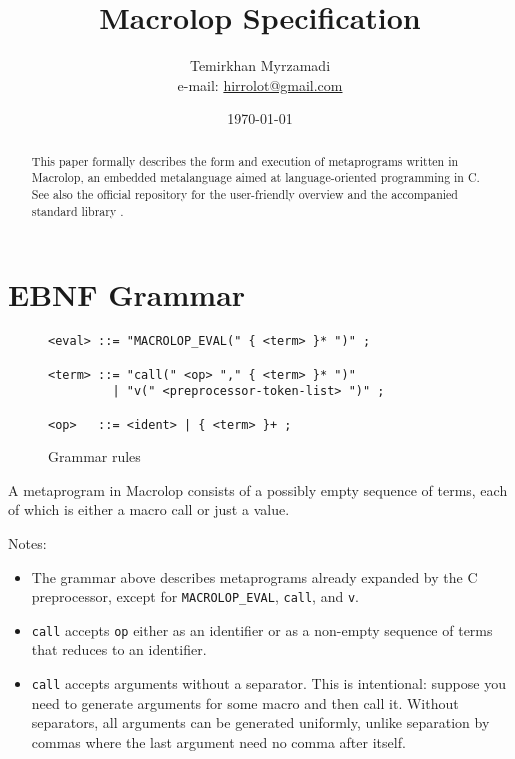 \documentclass[12pt]{article}
\theoremstyle{break}
\begin{document}
\title{Macrolop Specification}
\date{\today}
\author{Temirkhan Myrzamadi \\ e-mail: \href{mailto:hirrolot@gmail.com}{hirrolot@gmail.com}}
\maketitle

\begin{abstract}
This paper formally describes the form and execution of metaprograms written in Macrolop,
an embedded metalanguage aimed at language-oriented programming in C. See also the official
repository \cite{Macrolop} for the user-friendly overview and the accompanied standard
library \cite{MacrolopDocs}.
\end{abstract}

\tableofcontents

\newpage

\section{EBNF Grammar}

\begin{figure}[H]
    \caption{Grammar rules}

\begin{verbatim}
<eval> ::= "MACROLOP_EVAL(" { <term> }* ")" ;

<term> ::= "call(" <op> "," { <term> }* ")"
         | "v(" <preprocessor-token-list> ")" ;

<op>   ::= <ident> | { <term> }+ ;
\end{verbatim}

\end{figure}

A metaprogram in Macrolop consists of a possibly empty sequence of terms, each of which
is either a macro call or just a value.

Notes:

\begin{itemize}
    \item The grammar above describes metaprograms already expanded by the C preprocessor,
    except for \texttt{MACROLOP\_EVAL}, \texttt{call}, and \texttt{v}.
    \item \texttt{call} accepts \texttt{op} either as an identifier or as a non-empty
    sequence of terms that reduces to an identifier.
    \item \texttt{call} accepts arguments without a separator. This is intentional: suppose
    you need to generate arguments for some macro and then call it. Without separators, all
    arguments can be generated uniformly, unlike separation by commas where the last argument
    need no comma after itself.
\end{itemize}
\end{document}
